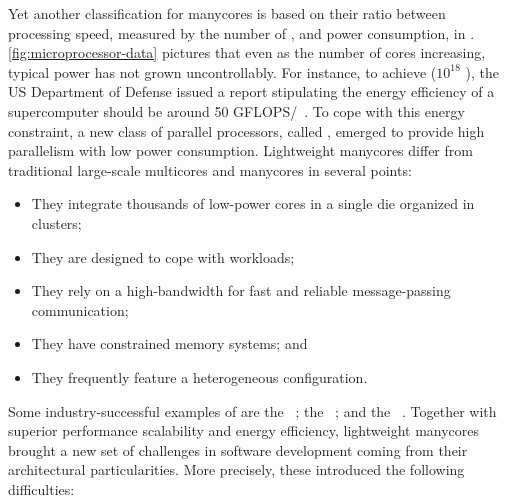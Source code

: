 	Yet another classification for manycores is based on
	their ratio between processing speed, measured by the number of \flops, and power consumption,
	in \watts. \autoref{fig:microprocessor-data} pictures that even as the
	number of cores increasing, typical power has not grown uncontrollably.
	For instance, to achieve \exascale ($10^{18}$ \flops), the US Department
	of Defense issued a report stipulating the energy efficiency of a
	supercomputer should be around 50 GFLOPS/\watts~\cite{darpa:exascale}. 
	To cope with this energy constraint, a new class of
	parallel processors, called \lightweight \manycores, emerged to
	provide high parallelism with low power consumption.
	Lightweight manycores differ from traditional large-scale
	multicores and manycores in several points: 

	\begin{itemize}
		\item They integrate thousands of low-power cores in a single die organized in clusters;
		\item They are designed to cope with \mimd workloads;
		\item They rely on a high-bandwidth \noc for fast and reliable message-passing communication;
		\item They have constrained memory systems; and
		\item They frequently feature a heterogeneous configuration.
	\end{itemize}

	Some industry-successful examples of \lightweight \manycores are the
	\mppa~\cite{DeDinechin2013-1}; the \epiphany~\cite{olofsson2014};
	and the \taihulight~\cite{zheng2015}. Together with superior performance
	scalability and energy efficiency, lightweight manycores brought a new
	set of challenges in software development coming from their
	architectural particularities. More precisely, these 
	introduced the following difficulties:


